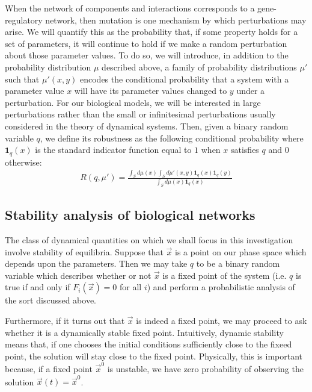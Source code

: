 When the network of components and interactions corresponds to a gene-regulatory network, then mutation is one mechanism by which perturbations may arise.  We will quantify this as the probability that, if some property holds for a set of parameters, it will continue to hold if we make a random perturbation about those parameter values. To do so, we will introduce, in addition to the probability distribution $\mu$ described above, a family of probability distributions $\mu'$ such that $\mu'(x,y)$ encodes the conditional probability that a system with a parameter value $x$ will have its parameter values changed to $y$ under a perturbation.  For our biological models, we will be interested in large perturbations rather than the small or infinitesimal perturbations usually considered in the theory of dynamical systems.  Then, given a binary random variable $q$, we define its robustness as the following conditional probability where $\mathbf{1}_q(x)$ is the standard indicator function equal to $1$ when $x$ satisfies $q$ and $0$ otherwise:
\begin{align}\label{eq:robustness}
  R (q,\mu') =
  \frac{\int_S d\mu(x) \int_S d\mu'(x,y) \mathbf{1}_q(x) \mathbf{1}_q(y)}
  {\int_S d\mu(x) \mathbf{1}_q(x)}
\end{align}

\subsection{Stability analysis of biological networks}
The class of dynamical quantities on which we shall focus in this
investigation involve stability of equilibria.  Suppose that $\vec x$
is a point on our phase space which depends upon the parameters.  Then
we may take $q$ to be a binary random variable which describes whether
or not $\vec x$ is a fixed point of the system (i.e. $q$ is true if and only if
$F_i(\vec{x})=0$ for all $i$) and perform a probabilistic analysis
of the sort discussed above.

Furthermore, if it turns out that $\vec x$ is indeed a fixed point, we
may proceed to ask whether it is a dynamically stable fixed point.
Intuitively, dynamic stability means that, if one chooses the initial
conditions sufficiently close to the fixeed point, the solution will
stay close to the fixed point.  Physically, this is important because,
if a fixed point ${\vec x}^0$ is unstable, we have zero probability of
observing the solution ${\vec x}(t) = {\vec x}^0$.

